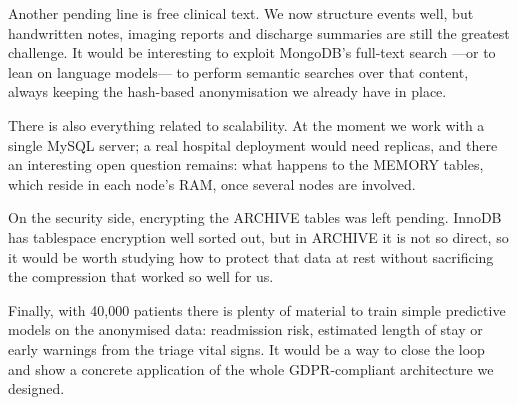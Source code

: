 \documentclass[../main.tex]{subfiles}
\begin{document}
Another pending line is free clinical text. We now structure events well, but handwritten notes, imaging reports and discharge summaries are still the greatest challenge. It would be interesting to exploit MongoDB's full-text search ---or to lean on language models--- to perform semantic searches over that content, always keeping the hash-based anonymisation we already have in place.

There is also everything related to scalability. At the moment we work with a single MySQL server; a real hospital deployment would need replicas, and there an interesting open question remains: what happens to the MEMORY tables, which reside in each node's RAM, once several nodes are involved.

On the security side, encrypting the ARCHIVE tables was left pending. InnoDB has tablespace encryption well sorted out, but in ARCHIVE it is not so direct, so it would be worth studying how to protect that data at rest without sacrificing the compression that worked so well for us.

Finally, with 40,000 patients there is plenty of material to train simple predictive models on the anonymised data: readmission risk, estimated length of stay or early warnings from the triage vital signs. It would be a way to close the loop and show a concrete application of the whole GDPR-compliant architecture we designed.
\end{document}

